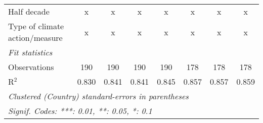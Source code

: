 \begin{tabular}{lccccccc}
   Half decade                                                                               & x            & x            & x            & x           & x             & x             & x\\  
   Type of climate action/measure                                                            & x            & x            & x            & x           & x             & x             & x\\  
   \midrule \emph{Fit statistics}\\
   Observations                                                                              & 190          & 190          & 190          & 190         & 178           & 178           & 178\\  
   R$^2$                                                                                     & 0.830        & 0.841        & 0.841        & 0.845       & 0.857         & 0.857         & 0.859\\  
   \midrule
   \multicolumn{8}{l}{\emph{Clustered (Country) standard-errors in parentheses}}\\
   \multicolumn{8}{l}{\emph{Signif. Codes: ***: 0.01, **: 0.05, *: 0.1}}\\
\end{tabular}
\par\endgroup


